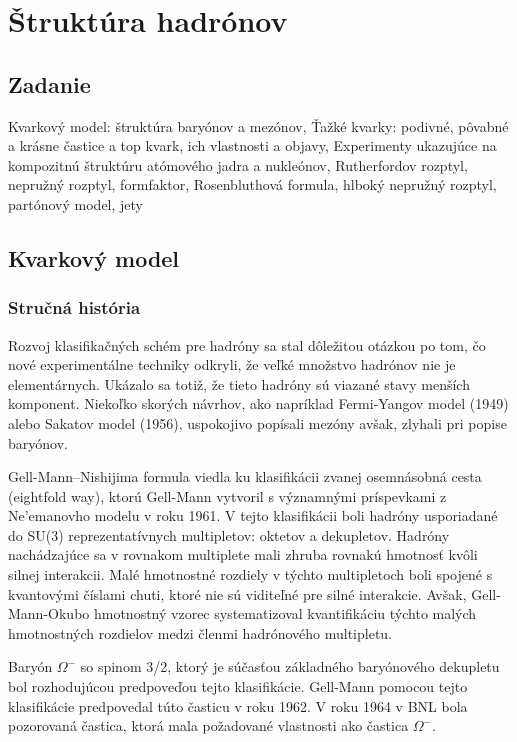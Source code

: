 \documentclass[../../main.tex]{subfiles}
\begin{document}
\chapter{Štruktúra hadrónov}

\section{Zadanie}
Kvarkový model: štruktúra baryónov a mezónov, Ťažké kvarky: podivné, pôvabné a krásne častice a top kvark, ich vlastnosti a objavy, Experimenty ukazujúce na kompozitnú štruktúru atómového jadra a nukleónov, Rutherfordov rozptyl, nepružný rozptyl, formfaktor, Rosenbluthová formula, hlboký nepružný rozptyl, partónový model, jety 

\section{Kvarkový model}
\subsection{Stručná história}
Rozvoj klasifikačných schém pre hadróny sa stal dôležitou otázkou po tom, čo nové experimentálne techniky odkryli, že veľké množstvo hadrónov nie je  elementárnych. Ukázalo sa totiž, že tieto hadróny sú viazané stavy menších komponent. Niekoľko skorých návrhov, ako napríklad Fermi-Yangov model (1949) alebo Sakatov model (1956), uspokojivo popísali mezóny avšak, zlyhali pri popise baryónov.

Gell-Mann–Nishijima formula viedla ku klasifikácii zvanej osemnásobná cesta (eightfold way), ktorú Gell-Mann vytvoril s významnými príspevkami z Ne'emanovho modelu v roku 1961. V tejto klasifikácii boli hadróny usporiadané do SU(3) reprezentatívnych multipletov: oktetov a dekupletov. Hadróny nachádzajúce sa v rovnakom multiplete mali zhruba rovnakú hmotnosť kvôli silnej interakcii. Malé hmotnostné rozdiely v týchto multipletoch boli spojené s kvantovými číslami chuti, ktoré nie sú viditeľné pre silné interakcie. Avšak, Gell-Mann-Okubo hmotnostný vzorec systematizoval kvantifikáciu týchto malých hmotnostných rozdielov medzi členmi hadrónového multipletu.

Baryón $\Omega^{-}$ so spinom 3/2, ktorý je súčasťou základného baryónového dekupletu bol rozhodujúcou predpoveďou tejto klasifikácie. Gell-Mann pomocou tejto klasifikácie predpovedal túto časticu v roku 1962. V roku 1964 v BNL bola pozorovaná častica, ktorá mala požadované vlastnosti ako častica $\Omega^{-}$.
\end{document}

